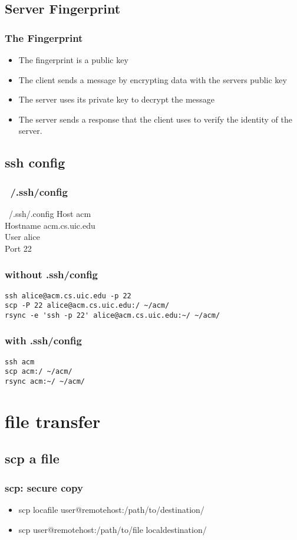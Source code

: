 \documentclass[hyperref={pdfpagelabels=false}]{beamer}
\begin{document}
\subsection{Server Fingerprint}
\frame
{
    \frametitle{The Fingerprint}
    \begin{itemize}
    \item{The fingerprint is a public key}
    \item{The client sends a message by encrypting data with the servers public key}
    \item{The server uses its private key to decrypt the message}
    \item{The server sends a response that the client uses to verify the identity of the server.}
    \end{itemize}
}
\subsection{ssh config}
\frame
{
	\frametitle{~/.ssh/config}
	\begin{block}{~/.ssh/.config}
	Host acm\\
	Hostname acm.cs.uic.edu\\
	User alice\\
	Port 22
	\end{block}
}
\begin{frame}[fragile]
\frametitle{without .ssh/config}
\begin{verbatim}
ssh alice@acm.cs.uic.edu -p 22
scp -P 22 alice@acm.cs.uic.edu:/ ~/acm/
rsync -e 'ssh -p 22' alice@acm.cs.uic.edu:~/ ~/acm/
\end{verbatim}
\end{frame}
\begin{frame}[fragile]
\frametitle{with .ssh/config}
\begin{verbatim}
ssh acm
scp acm:/ ~/acm/
rsync acm:~/ ~/acm/
\end{verbatim}
\end{frame}
\section{file transfer}
\subsection{scp a file}
\frame
{
    \frametitle{scp: secure copy}
    \begin{itemize}
    \item{scp locafile user@remotehost:/path/to/destination/}
    \item{scp user@remotehost:/path/to/file localdestination/}
    \end{itemize}
}
\end{document}

